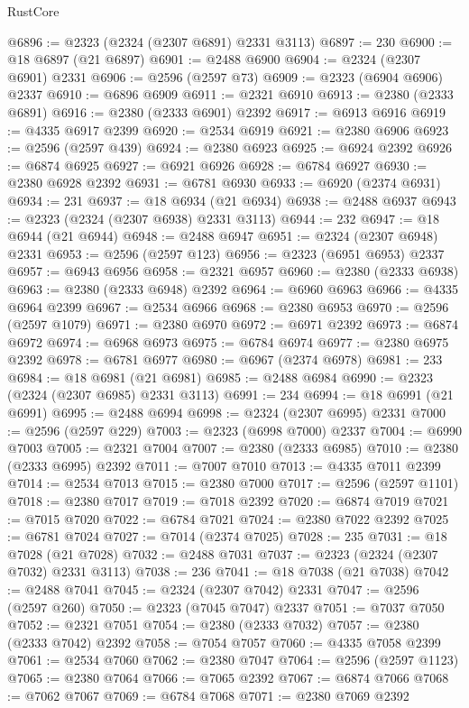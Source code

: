 \begin{lexlean}{RustCore}
\begin{coremodule}
@6896 := @2323 (@2324 (@2307 @6891) @2331 @3113)
@6897 := 230
@6900 := @18 @6897 (@21 @6897)
@6901 := @2488 @6900
@6904 := @2324 (@2307 @6901) @2331
@6906 := @2596 (@2597 @73)
@6909 := @2323 (@6904 @6906) @2337
@6910 := @6896 @6909
@6911 := @2321 @6910
@6913 := @2380 (@2333 @6891)
@6916 := @2380 (@2333 @6901) @2392
@6917 := @6913 @6916
@6919 := @4335 @6917 @2399
@6920 := @2534 @6919
@6921 := @2380 @6906
@6923 := @2596 (@2597 @439)
@6924 := @2380 @6923
@6925 := @6924 @2392
@6926 := @6874 @6925
@6927 := @6921 @6926
@6928 := @6784 @6927
@6930 := @2380 @6928 @2392
@6931 := @6781 @6930
@6933 := @6920 (@2374 @6931)
@6934 := 231
@6937 := @18 @6934 (@21 @6934)
@6938 := @2488 @6937
@6943 := @2323 (@2324 (@2307 @6938) @2331 @3113)
@6944 := 232
@6947 := @18 @6944 (@21 @6944)
@6948 := @2488 @6947
@6951 := @2324 (@2307 @6948) @2331
@6953 := @2596 (@2597 @123)
@6956 := @2323 (@6951 @6953) @2337
@6957 := @6943 @6956
@6958 := @2321 @6957
@6960 := @2380 (@2333 @6938)
@6963 := @2380 (@2333 @6948) @2392
@6964 := @6960 @6963
@6966 := @4335 @6964 @2399
@6967 := @2534 @6966
@6968 := @2380 @6953
@6970 := @2596 (@2597 @1079)
@6971 := @2380 @6970
@6972 := @6971 @2392
@6973 := @6874 @6972
@6974 := @6968 @6973
@6975 := @6784 @6974
@6977 := @2380 @6975 @2392
@6978 := @6781 @6977
@6980 := @6967 (@2374 @6978)
@6981 := 233
@6984 := @18 @6981 (@21 @6981)
@6985 := @2488 @6984
@6990 := @2323 (@2324 (@2307 @6985) @2331 @3113)
@6991 := 234
@6994 := @18 @6991 (@21 @6991)
@6995 := @2488 @6994
@6998 := @2324 (@2307 @6995) @2331
@7000 := @2596 (@2597 @229)
@7003 := @2323 (@6998 @7000) @2337
@7004 := @6990 @7003
@7005 := @2321 @7004
@7007 := @2380 (@2333 @6985)
@7010 := @2380 (@2333 @6995) @2392
@7011 := @7007 @7010
@7013 := @4335 @7011 @2399
@7014 := @2534 @7013
@7015 := @2380 @7000
@7017 := @2596 (@2597 @1101)
@7018 := @2380 @7017
@7019 := @7018 @2392
@7020 := @6874 @7019
@7021 := @7015 @7020
@7022 := @6784 @7021
@7024 := @2380 @7022 @2392
@7025 := @6781 @7024
@7027 := @7014 (@2374 @7025)
@7028 := 235
@7031 := @18 @7028 (@21 @7028)
@7032 := @2488 @7031
@7037 := @2323 (@2324 (@2307 @7032) @2331 @3113)
@7038 := 236
@7041 := @18 @7038 (@21 @7038)
@7042 := @2488 @7041
@7045 := @2324 (@2307 @7042) @2331
@7047 := @2596 (@2597 @260)
@7050 := @2323 (@7045 @7047) @2337
@7051 := @7037 @7050
@7052 := @2321 @7051
@7054 := @2380 (@2333 @7032)
@7057 := @2380 (@2333 @7042) @2392
@7058 := @7054 @7057
@7060 := @4335 @7058 @2399
@7061 := @2534 @7060
@7062 := @2380 @7047
@7064 := @2596 (@2597 @1123)
@7065 := @2380 @7064
@7066 := @7065 @2392
@7067 := @6874 @7066
@7068 := @7062 @7067
@7069 := @6784 @7068
@7071 := @2380 @7069 @2392

\end{coremodule}
\end{lexlean}
